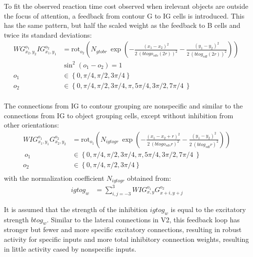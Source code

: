 To fit the observed reaction time cost observed when irelevant objects
are outside the focus of attention, a feedback
from contour G to IG cells is
introduced. This has the same pattern, but half the scaled weight as the
feedback to B cells and twice its standard
deviations: 
\begin{align}
	WG^{o_1}_{x_2,y_2}IG^{o_2}_{x_1,y_1}&=\text{rot}_{o_2}\left(N_{gtobr}\: \exp\left(-\frac{(x_1-x_2)^2}{2\: (btogo_{sds} (2r))^2}
	-\frac{(y_1-y_2)^2}{2\: (btog_{sdl} (2r))^2}\right)\right) \  \nonumber\\
	   	 &\sin^2(o_1-o_2) = 1 \nonumber\\
		 o_1&\in \left\{0,\pi/4,\pi/2,3\pi/4 \right\} \nonumber\\
	 o_2&\in \left\{0,\pi/4,\pi/2,3\pi/4,\pi,5\pi/4,3\pi/2,7\pi/4\ \right\} \nonumber\\
\end{align}

The connections from IG to contour grouping are nonspecific and similar to the connections from IG to object grouping cells, except without inhibition from other orientations:
\begin{align}
  WIG^{o_1}_{x_1,y_1}G^{o_2}_{x_2,y_2}&=\text{rot}_{o_1}\left(N_{igtogr}\:
          \exp\left(-\frac{(x_1-x_2+r)^2}{2\: (btogo_{sds} r)^2}
                  -\frac{(y_1-y_2)^2}{2\: (btog_{sdl} r)^2}\right)\right) \nonumber\\ \ 
	 o_1&\in \left\{0,\pi/4,\pi/2,3\pi/4,\pi,5\pi/4,3\pi/2,7\pi/4\ \right\} \nonumber\\
	 o_2&\in \left\{0,\pi/4,\pi/2,3\pi/4 \right\} \nonumber\\
\end{align}
with the normalization coefficient $N_{igtogr}$ obtained from:
\begin{align}
	igtog_w&=\sum^{3}_{i,j=-3} WIG^{o_1}_{x,y}G^{o_2}_{x+i,y+j} 	
\end{align}

It is assumed that the strength of the inhibition $igtog_w$ is equal to the excitatory strength $btog_w$. Similar to the lateral connections in V2, this feedback loop has stronger but fewer and more specific excitatory connections, resulting in robust activity for specific inputs and more total inhibitory connection weights, resulting in
little activity cased by nonspecific inputs.

\clearpage

